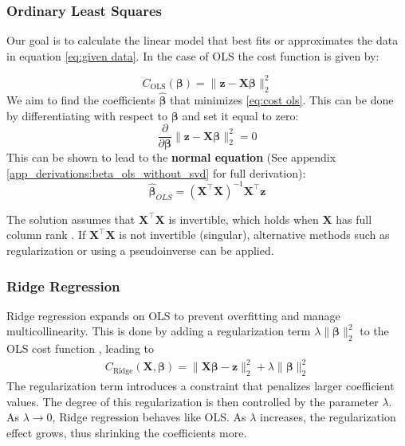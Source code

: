 \documentclass{article}
\begin{document}
\begin{multicols}{2}
\subsubsection*{Ordinary Least Squares}
Our goal is to calculate the linear model that best fits or approximates the data in equation \ref{eq:given data}. In the case of OLS the cost function is given by:

\begin{equation} \label{eq:cost ols}
    C_{\text{OLS}}(\boldsymbol{\beta}) = \|\bm{z} - \mathbf{X} \bm{\beta}\|_2^2
\end{equation}
We aim to find the coefficients $\hat{\boldsymbol{\beta}}$ that minimizes \ref{eq:cost ols}. This can be done by differentiating with respect to $\bm{\beta}$ and set it equal to zero:
$$ \frac{\partial}{\partial \bm{\beta}} \|\bm{z} - \mathbf{X} \boldsymbol{\beta}\|_2^2 = 0 $$
This can be shown to lead to the \textbf{normal equation} (See appendix \ref{app_derivations:beta_ols_without_svd} for full derivation):
$$ \hat{\boldsymbol{\beta}}_{OLS} = \left( \mathbf{X}^\top \mathbf{X} \right)^{-1} \mathbf{X}^\top \bm{z} $$

The solution assumes that $\mathbf{X}^\top \mathbf{X}$ is invertible, which holds when $\mathbf{X}$ has full column rank \cite{guntuboyina_fall_nodate}. If $\mathbf{X}^\top \mathbf{X}$ is not invertible (singular), alternative methods such as regularization or using a pseudoinverse can be applied.\cite{deisenroth_mathematics_2020}

\subsubsection*{Ridge Regression}
 Ridge regression expands on OLS to prevent overfitting and manage multicollinearity. This is done by adding a regularization term $\lambda \| \bm{\beta} \|_{2}^{2}$ to the OLS cost function \cite{noauthor_what_2023}, leading to
\begin{align} \label{eq:rigde cost}
C_{\text{Ridge}}(\mathbf{X}, \bm{\beta}) = \| \mathbf{X} \bm{\beta} - \bm{z} \|_2^2 + \lambda \| \bm{\beta} \|_{2}^{2}
\end{align}
The regularization term introduces a constraint that penalizes larger coefficient values. The degree of this regularization is then controlled by the parameter $\lambda$. 
As $\lambda \rightarrow 0$, Ridge regression behaves like OLS. As $\lambda$ increases, the regularization effect grows, thus shrinking the coefficients more.


\end{multicols}
\end{document}
